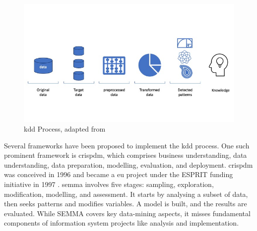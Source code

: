 \begin{figure}
\centering
\includegraphics[scale=0.55]{figures/imagens-tese.jpg}

\caption{\ac{kdd} Process, adapted from \cite{Fayyad_Piatetsky-Shapiro_Smyth_1996}} \label{fig:kdd-generic}
\end{figure}

Several frameworks have been proposed to implement the \ac{kdd} process. One such prominent framework is \ac{crispdm}, which comprises business understanding, data understanding, data preparation, modelling, evaluation, and deployment. \ac{crispdm} was conceived in 1996 and became a \ac{eu} project under the ESPRIT funding initiative in 1997 \cite{Chapman2000CRISPDM1S}. \ac{semma} \cite{rohanizadehProposedDataMining2009} involves five stages: sampling, exploration, modification, modelling, and assessment. It starts by analysing a subset of data, then seeks patterns and modifies variables. A model is built, and the results are evaluated. While SEMMA covers key data-mining aspects, it misses fundamental components of information system projects like analysis and implementation.

